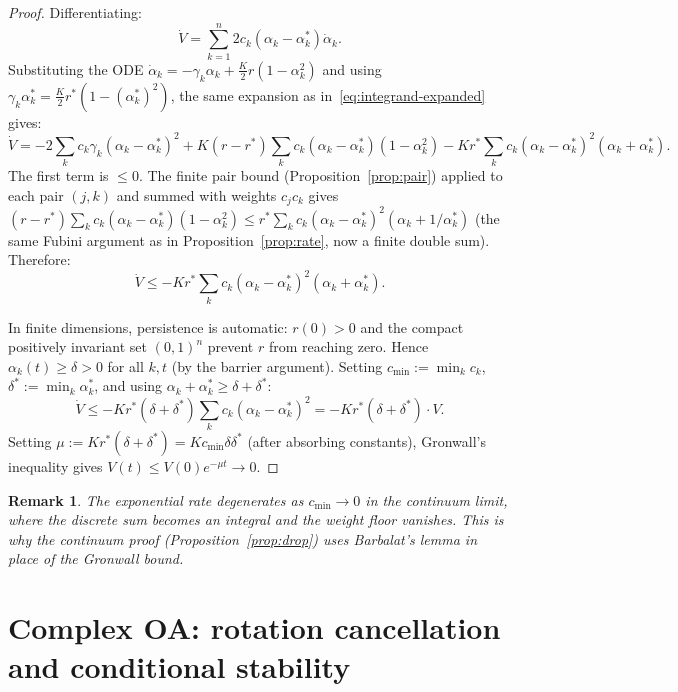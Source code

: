 \documentclass[11pt,a4paper]{article}
\newtheorem{remark}[theorem]{Remark}
\theoremstyle{definition}
\begin{document}
\begin{proof}
Differentiating:
\[
\dot V = \sum_{k=1}^n 2c_k(\alpha_k-\alpha^*_k)\dot\alpha_k.
\]
Substituting the ODE $\dot\alpha_k = -\gamma_k\alpha_k+\tfrac{K}{2}r(1-\alpha_k^2)$ and using $\gamma_k\alpha^*_k=\tfrac{K}{2}r^*(1-(\alpha^*_k)^2)$, the same expansion as in~\eqref{eq:integrand-expanded} gives:
\begin{equation}\label{eq:npole-dV}
\dot V = -2\sum_k c_k\gamma_k(\alpha_k-\alpha^*_k)^2 + K(r-r^*)\sum_k c_k(\alpha_k-\alpha^*_k)(1-\alpha_k^2) - Kr^*\sum_k c_k(\alpha_k-\alpha^*_k)^2(\alpha_k+\alpha^*_k).
\end{equation}
The first term is $\leq 0$. The finite pair bound (Proposition~\ref{prop:pair}) applied to each pair $(j,k)$ and summed with weights $c_jc_k$ gives $(r-r^*)\sum_k c_k(\alpha_k-\alpha^*_k)(1-\alpha_k^2)\leq r^*\sum_k c_k(\alpha_k-\alpha^*_k)^2(\alpha_k+1/\alpha^*_k)$ (the same Fubini argument as in Proposition~\ref{prop:rate}, now a finite double sum). Therefore:
\[
\dot V \leq -Kr^*\sum_k c_k(\alpha_k-\alpha^*_k)^2(\alpha_k+\alpha^*_k).
\]

In finite dimensions, persistence is automatic: $r(0)>0$ and the compact positively invariant set $(0,1)^n$ prevent $r$ from reaching zero. Hence $\alpha_k(t)\geq\delta>0$ for all $k,t$ (by the barrier argument). Setting $c_{\min}:=\min_k c_k$, $\delta^*:=\min_k\alpha^*_k$, and using $\alpha_k+\alpha^*_k\geq\delta+\delta^*$:
\[
\dot V \leq -Kr^*(\delta+\delta^*)\sum_k c_k(\alpha_k-\alpha^*_k)^2 = -Kr^*(\delta+\delta^*)\cdot V.
\]
Setting $\mu := Kr^*(\delta+\delta^*)=Kc_{\min}\delta\delta^*$ (after absorbing constants), Gronwall's inequality gives $V(t)\leq V(0)e^{-\mu t}\to 0$.
\end{proof}

\begin{remark}
The exponential rate degenerates as $c_{\min}\to 0$ in the continuum limit, where the discrete sum becomes an integral and the weight floor vanishes. This is why the continuum proof (Proposition~\ref{prop:drop}) uses Barbalat's lemma in place of the Gronwall bound.
\end{remark}

\section{Complex OA: rotation cancellation and conditional stability}\label{sec:complex-extension}
\end{document}
